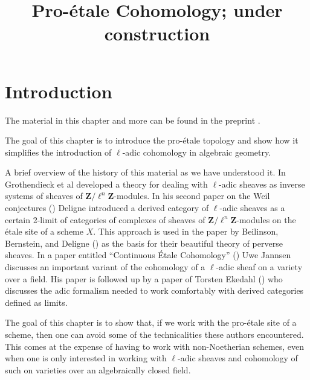 

%


\title{Pro-\'etale Cohomology; under construction}


\maketitle

\label{section-phantom}

\tableofcontents

\section{Introduction}
\label{section-introduction}

\noindent
The material in this chapter and more can be found in the preprint \cite{BS}.

\medskip\noindent
The goal of this chapter is to introduce the pro-\'etale topology and
show how it simplifies the introduction of $\ell$-adic cohomology in
algebraic geometry.

\medskip\noindent
A brief overview of the history of this material as we have understood it.
In \cite[Expos\'es V and VI]{SGA5} Grothendieck et al developed a theory for
dealing with $\ell$-adic sheaves as inverse systems of sheaves of
$\mathbf{Z}/\ell^n\mathbf{Z}$-modules.
In his second paper on the Weil conjectures (\cite{WeilII}) Deligne introduced
a derived category of $\ell$-adic sheaves as a certain 2-limit of categories
of complexes of sheaves of $\mathbf{Z}/\ell^n\mathbf{Z}$-modules on the
\'etale site of a scheme $X$. This approach is used in the paper by
Beilinson, Bernstein, and Deligne (\cite{BBD}) as the basis for their
beautiful theory of perverse sheaves. In a paper entitled ``Continuous
\'Etale Cohomology'' (\cite{Jannsen}) Uwe Jannsen discusses an important
variant of the cohomology of a $\ell$-adic sheaf on a variety over a field.
His paper is followed up by a paper of Torsten Ekedahl (\cite{Ekedahl})
who discusses the adic formalism needed to work comfortably with derived
categories defined as limits.

\medskip\noindent
The goal of this chapter is to show that, if we work with the pro-\'etale
site of a scheme, then one can avoid some of the technicalities these
authors encountered. This comes at the expense of having to work with
non-Noetherian schemes, even when one is only interested in working with
$\ell$-adic sheaves and cohomology of such on varieties over an
algebraically closed field.




